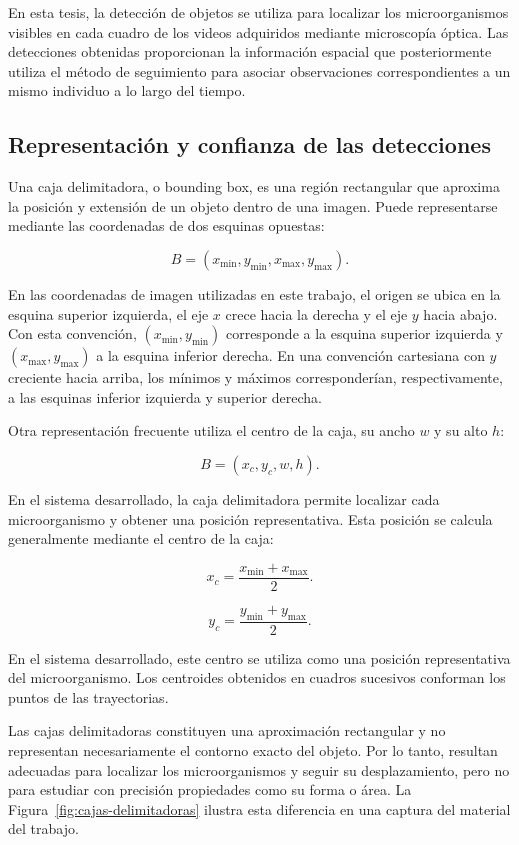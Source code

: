 En esta tesis, la detección de objetos se utiliza para localizar los microorganismos visibles en cada cuadro de los videos adquiridos mediante microscopía óptica. Las detecciones obtenidas proporcionan la información espacial que posteriormente utiliza el método de seguimiento para asociar observaciones correspondientes a un mismo individuo a lo largo del tiempo.

\subsection{Representación y confianza de las detecciones}

Una caja delimitadora, o bounding box, es una región rectangular que aproxima la posición y extensión de un objeto dentro de una imagen. Puede representarse mediante las coordenadas de dos esquinas opuestas:

\[
B=(x_{\min},y_{\min},x_{\max},y_{\max}).
\]

En las coordenadas de imagen utilizadas en este trabajo, el origen se ubica en la esquina superior izquierda, el eje $x$ crece hacia la derecha y el eje $y$ hacia abajo. Con esta convención, $(x_{\min},y_{\min})$ corresponde a la esquina superior izquierda y $(x_{\max},y_{\max})$ a la esquina inferior derecha. En una convención cartesiana con $y$ creciente hacia arriba, los mínimos y máximos corresponderían, respectivamente, a las esquinas inferior izquierda y superior derecha.

Otra representación frecuente utiliza el centro de la caja, su ancho $w$ y su alto $h$:

\[
B=(x_c,y_c,w,h).
\]

En el sistema desarrollado, la caja delimitadora permite localizar cada microorganismo y obtener una posición representativa. Esta posición se calcula generalmente mediante el centro de la caja:

\[
x_c=\frac{x_{\min}+x_{\max}}{2}.
\]

\[
y_c=\frac{y_{\min}+y_{\max}}{2}.
\]

En el sistema desarrollado, este centro se utiliza como una posición representativa del microorganismo. Los centroides obtenidos en cuadros sucesivos conforman los puntos de las trayectorias.

Las cajas delimitadoras constituyen una aproximación rectangular y no representan necesariamente el contorno exacto del objeto. Por lo tanto, resultan adecuadas para localizar los microorganismos y seguir su desplazamiento, pero no para estudiar con precisión propiedades como su forma o área. La Figura~\ref{fig:cajas-delimitadoras} ilustra esta diferencia en una captura del material del trabajo.

